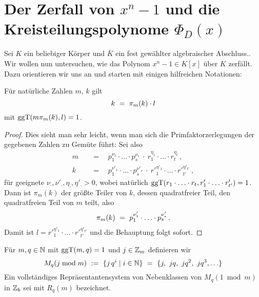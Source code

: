 \chapter{Der Zerfall von $x^n-1$ und die Kreisteilungspolynome $\Phi_D(x)$}
\label{chap:kreisteilungspolynome}

Sei $K$ ein beliebiger Körper und $\bar K$ ein fest gewählter algebraischer
Abschluss.. Wir wollen nun untersuchen, wie das Polynom
$x^n-1 \in K[x]$ über $K$ zerfällt. Dazu orientieren wir uns 
an \autocite{lidl1997finite} und starten mit einigen hilfreichen Notationen:


\begin{lemma}
  \label{lemma:uber-pi-m-1}
  
\end{lemma}

\begin{lemma}
  \label{lemma:uber-pi-m-2}
  Für natürliche Zahlen $m$, $k$ gilt
  \[ k \ =\  \pi_m(k)\cdot l \]
  mit $\operatorname{ggT}(m \pi_m(k), l) = 1$.
\end{lemma}
\begin{proof}
  Dies sieht man sehr leicht, wenn man sich die Primfaktorzerlegungen der
  gegebenen Zahlen zu Gemüte führt: Sei also 
  \begin{align*}
    m \quad&=\quad p_1^{\nu_1} \cdot\ldots\cdot p_s^{\nu_s}\ \cdot\ 
      r_1^{\eta_1}\cdot\ldots\cdot r_t^{\eta_t}\,,\\
    k \quad&=\quad p_1^{\nu'_1} \cdot\ldots\cdot p_s^{\nu'_s}\ \cdot\ 
      r'_1^{\eta'_1}\cdot\ldots\cdot r'_{t'}^{\eta'_{t'}}\,,
  \end{align*}
  für geeignete $\nu_\cdot,\nu'_\cdot,\eta_\cdot,\eta'_\cdot > 0$, wobei
  natürlich $\operatorname{ggT}(r_1\cdot\ldots\cdot r_t, r'_1\cdot\ldots\cdot r'_{t'}) = 1$.
  Dann ist $\pi_m(k)$ der größte Teiler von $k$, dessen quadratfreier Teil, den
  quadratfreien Teil von $m$ teilt, also
  \[ \pi_m(k) \ =\  p_1^{\nu'_1}\cdot\ldots\cdot p_s^{\nu'_s}\,.\]
  Damit ist $l = r'_1^{\eta'_1}\cdot\ldots\cdot r'_{t'}^{\eta'_{t'}}$ und die
  Behauptung folgt sofort.
\end{proof} 

\begin{definition}
  Für $m,q\in\mathbb{N}$ mit $\operatorname{ggT}(m,q) = 1$ und $j \in \mathbb{Z}_m$ definieren wir
  \[ M_q(j\bmod m) \ :=\  \{ j\,q^i \mid i\in\mathbb{N}\} \ =\  
    \{j,\ jq,\ jq^2,\ jq^3,\ldots\}\]
  Ein vollständiges Repräsentantensystem von Nebenklassen von $M_q(1\bmod m)$
  in $\mathbb{Z}_b$ sei mit $R_q(m)$ bezeichnet.
\end{definition}


